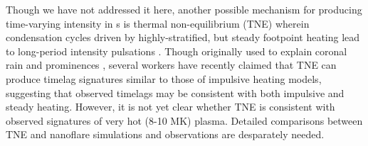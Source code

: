 Though we have not addressed it here, another possible mechanism for producing time-varying intensity in \AR s is thermal non-equilibrium (TNE) wherein condensation cycles driven by highly-stratified, but steady footpoint heating lead to long-period intensity pulsations \citep{kuin_thermal_1982}. Though originally used to explain coronal rain \citep{antolin_coronal_2010,antolin_multithermal_2015,auchere_coronal_2018} and prominences \citep{antiochos_model_1991}, several workers \citep{mok_three-dimensional_2016,winebarger_investigation_2016,froment_long-period_2017,winebarger_identifying_2018,froment_occurrence_2018} have recently claimed that TNE can produce timelag signatures similar to those of impulsive heating models, suggesting that observed timelags may be consistent with both impulsive and steady heating. However, it is not yet clear whether TNE is consistent with observed signatures of very hot (8-10 MK) plasma. Detailed comparisons between TNE and nanoflare simulations and observations are desparately needed.
